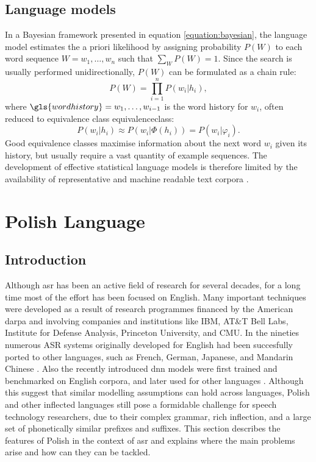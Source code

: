 \subsection{Language models}
\label{subsection:lm}
In a Bayesian framework presented in equation \ref{equation:bayesian}, the language model estimates the a priori likelihood by assigning probability $P(W)$ to each word sequence $W=w_{1}, \ldots, w_{n}$ such that $\sum_{W}P(W)=1$. Since the search is usually performed unidirectionally, $P(W)$ can be formulated as a chain rule:
\begin{equation}
\label{equation:chain}
  P(W)=\prod^{n}_{i=1}P(w_{i}|h_{i}),
\end{equation}
where $\gls{wordhistory}=w_{1}, \ldots, w_{i-1}$ is the word history for $w_{i}$, often reduced to equivalence class \gls{equivalenceclass}:
\begin{equation}
	P(w_{i}|h_{i})\approx P(w_{i}|\Phi(h_{i}))=P(w_{i}|\varphi_{i}).
\end{equation}
Good equivalence classes maximise information about the next word $w_{i}$ given its history, but usually require a vast quantity of example sequences. The development of effective statistical language models is therefore limited by the availability of representative and machine readable text corpora \cite{rosenfeld2000two}.

\section{Polish Language}
\label{section:polish}
\subsection{Introduction}
Although \gls{asr} has been an active field of research for several decades, for a long time most of the effort has been focused on English.  Many important techniques were developed as a result of research programmes financed by the American \gls{darpa} and involving companies and institutions like IBM, AT\&T Bell Labs, Institute for Defense Analysis, Princeton University, and CMU. In the nineties numerous ASR systems originally developed for English had been succesfully ported to other languages, such as French, German, Japanese, and Mandarin Chinese \cite{besacier2014automatic}. Also the recently introduced \gls{dnn} models were first trained and benchmarked on English corpora, and later used for other languages \cite{hinton2012deep}. Although this suggest that similar modelling assumptions can hold across languages, Polish and other inflected languages still pose a formidable challenge for speech technology researchers, due to their complex grammar, rich inflection, and a large set of phonetically similar prefixes and suffixes. This section describes the features of Polish in the context of \gls{asr} and explains where the main problems arise and how can they can be tackled.
